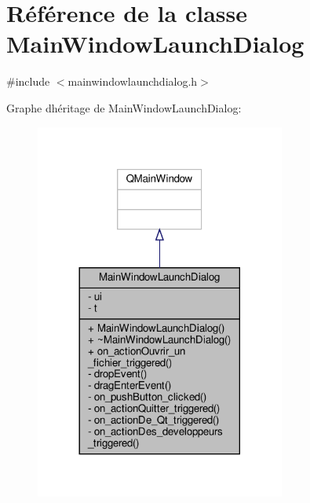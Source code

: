 \hypertarget{classMainWindowLaunchDialog}{}\section{Référence de la classe Main\+Window\+Launch\+Dialog}
\label{classMainWindowLaunchDialog}


{\ttfamily \#include $<$mainwindowlaunchdialog.\+h$>$}



Graphe d\textquotesingle{}héritage de Main\+Window\+Launch\+Dialog\+:\nopagebreak
\begin{figure}[H]
\begin{center}
\leavevmode
\includegraphics[width=233pt]{classMainWindowLaunchDialog__inherit__graph}
\end{center}
\end{figure}


